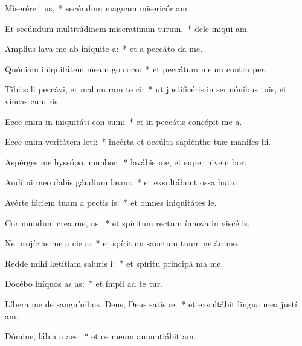 \item Miserére i us,~* secúndum magnam misericór am.
\item Et secúndum multitúdinem miseratinum turum,~* dele iniqui am.
\item Amplius lava me ab iniquite a:~* et a peccáto  da me.
\item Quóniam iniquitátem meam go coco:~* et peccátum meum contra   per.
\item Tibi soli peccávi, et malum ram te ci:~* ut justificéris in sermónibus tuis, et vincas cum ris.
\item Ecce enim in iniquitáti con sum:~* et in peccátis concépit me  a.
\item Ecce enim veritátem leti:~* incérta et occúlta sapiéntiæ tuæ manifes hi.
\item Aspérges me hyssópo,  munbor:~* lavábis me, et super nivem bor.
\item Audítui meo dabis gáudium  læam:~* et exsultábunt ossa huta.
\item Avérte fáciem tuam a pectis is:~* et omnes iniquitátes  le.
\item Cor mundum crea  me, us:~* et spíritum rectum ínnova in viscé is.
\item Ne projícias me a cie a:~* et spíritum sanctum tuum ne áu  me.
\item Redde mihi lætítiam saluris i:~* et spíritu principá ma me.
\item Docébo iníquos as as:~* et ímpii ad te tur.
\item Líbera me de sanguínibus, Deus, Deus satis æ:~* et exsultábit lingua mea justí am.
\item Dómine, lábia a aes:~* et os meum annuntiábit  am.

